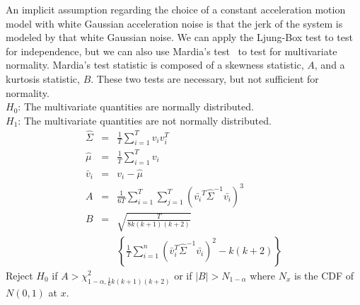 \medskip
{} An implicit assumption regarding the choice of a constant acceleration motion model with white Gaussian acceleration noise is that the jerk of the system is modeled by that white Gaussian noise.  We can apply the Ljung-Box test to test for independence, but we can also use Mardia's test~\cite{1970} to test for multivariate normality.  Mardia's test statistic is composed of a skewness statistic, $A$, and a kurtosis statistic, $B$.  These two tests are necessary, but not sufficient for normality.\\
$H_0$: The multivariate quantities are normally distributed.\\
$H_1$: The multivariate quantities are not normally distributed.\\
\begin{eqnarray*}
\hat{\Sigma} &=& \frac{1}{T}\sum_{i=1}^Tv_iv_i^T\\
\hat{\mu} &=& \frac{1}{T}\sum_{i=1}^Tv_i\\
\bar{v}_i &=& v_i - \hat{\mu}\\
A &=& \frac{1}{6T}\sum_{i=1}^T\sum_{j=1}^T(\bar{v_i}^T \hat{\Sigma}^{-1} \bar{v_i})^3\\
B &=& \sqrt{\frac{T}{8k(k+1)(k+2)}} \\&&\left\{\frac{1}{T}\sum_{i=1}^n(\bar{v}_i^T \hat{\Sigma}^{-1} \bar{v_i})^2 - k(k+2)\right\}
\end{eqnarray*}
Reject $H_0$ if $A > \chi^2_{1-\alpha, \frac{1}{6}k(k+1)(k+2)}$ or if $|B| > N_{1-\alpha}$ where $N_x$ is the CDF of $N(0,1)$ at $x$.
